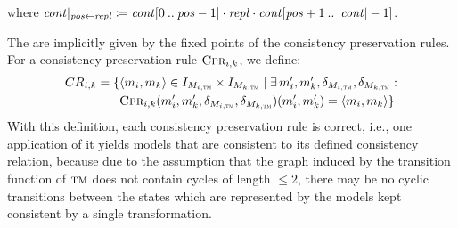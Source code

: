where $\mathit{cont}|_{\mathit{pos} \gets \mathit{repl}} \coloneqq \mathit{cont}[0\:..\:\mathit{pos}-1] \cdot \mathit{repl} \cdot \mathit{cont}[\mathit{pos}+1\:..\:|\mathit{cont}|-1]$.

The \modellevelconsistencyrelations are implicitly given by the fixed points of the consistency preservation rules.
For a consistency preservation rule $\textsc{Cpr}_{i,k}$, we define:
\begin{align*}
    \consistencyrelation{CR}{i,k} = \setted{
    & 
    \tupled{\model{m}{i}, \model{m}{k}} \in \metamodelinstanceset{M}{i,\TuringMachine} \times \metamodelinstanceset{M}{k,\TuringMachine} \mid 
    \exists \model{m}{i}', \model{m}{k}', \change{\metamodel{M}{i,\TuringMachine}}, \change{\metamodel{M}{k,\TuringMachine}} : \\
    & 
    \consistencypreservationrule{i,k}(\model{m}{i}',\model{m}{k}',\change{\metamodel{M}{i,\TuringMachine}}, \change{\metamodel{M}{k,\TuringMachine}})(\model{m}{i}',\model{m}{k}') = \tupled{\model{m}{i}, \model{m}{k}}}
\end{align*} 
With this definition, each consistency preservation rule is correct, i.e., one application of it yields models that are consistent to its defined consistency relation, because due to the assumption that the graph induced by the transition function of $\textsc{tm}$ does not contain cycles of length $\leq 2$, there may be no cyclic transitions between the states which are represented by the models kept consistent by a single transformation.

